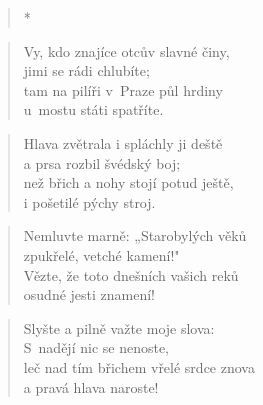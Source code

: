 \begin{verse}
*
\end{verse}

\begin{verse}
Vy, kdo znajíce otcův slavné činy, \\
jimi se rádi chlubíte; \\
tam na pilíři v~Praze půl hrdiny \\
u~mostu státi spatříte.
\end{verse}

\begin{verse}
Hlava zvětrala i spláchly ji deště \\
a prsa rozbil švédský boj; \\
než břich a nohy stojí potud ještě, \\
i pošetilé pýchy stroj.
\end{verse}

\begin{verse}
Nemluvte marně: „Starobylých věků \\
zpukřelé, vetché kamení!" \\
Vězte, že toto dnešních vašich reků \\
osudné jesti znamení!
\end{verse}

\begin{verse}
Slyšte a pilně važte moje slova: \\
S~nadějí nic se nenoste, \\
leč nad tím břichem vřelé srdce znova \\
a pravá hlava naroste!
\end{verse}